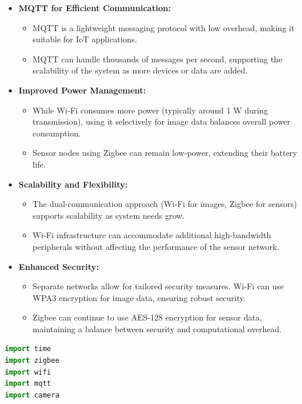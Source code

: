 \documentclass{article}
\begin{document}
\begin{enumerate}
\begin{itemize}
\begin{itemize}
        \item \textbf{MQTT for Efficient Communication:}
        \begin{itemize}
            \item MQTT is a lightweight messaging protocol with low overhead, making it suitable for IoT applications.
            \item MQTT can handle thousands of messages per second, supporting the scalability of the system as more devices or data are added.
        \end{itemize}
        
        \item \textbf{Improved Power Management:}
        \begin{itemize}
            \item While Wi-Fi consumes more power (typically around 1 W during transmission), using it selectively for image data balances overall power consumption.
            \item Sensor nodes using Zigbee can remain low-power, extending their battery life.
        \end{itemize}
        
        \item \textbf{Scalability and Flexibility:}
        \begin{itemize}
            \item The dual-communication approach (Wi-Fi for images, Zigbee for sensors) supports scalability as system needs grow.
            \item Wi-Fi infrastructure can accommodate additional high-bandwidth peripherals without affecting the performance of the sensor network.
        \end{itemize}
        
        \item \textbf{Enhanced Security:}
        \begin{itemize}
            \item Separate networks allow for tailored security measures. Wi-Fi can use WPA3 encryption for image data, ensuring robust security.
            \item Zigbee can continue to use AES-128 encryption for sensor data, maintaining a balance between security and computational overhead.
        \end{itemize}
    \end{itemize}
\end{itemize}

\begin{lstlisting}[language=Python]
import time
import zigbee
import wifi
import mqtt
import camera


\end{lstlisting}
\end{enumerate}
\end{document}
